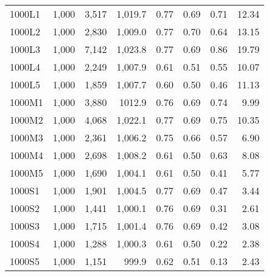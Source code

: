 \begin{table}
{\begin{tabular}{lrrrrrrr}
    \hline
 1000L1           & 1,000  & 3,517                        &1,019.7      & 0.77            & 0.69           & 0.71           & 12.34          \\
 1000L2           & 1,000 & 2,830                            &   1,009.0& 0.77            & 0.70           & 0.64           & 13.15          \\
 1000L3           & 1,000 & 7,142                         &1,023.8      & 0.77            & 0.69           & 0.86           & 19.79          \\
 1000L4           & 1,000 & 2,249                         &1,007.9      & 0.61            & 0.51           & 0.55           & 10.07          \\
 1000L5           & 1,000       & 1,859                        &1,007.7 & 0.60            & 0.50           & 0.46           & 11.13          \\
 1000M1           & 1,000 & 3,880 &1012.9                         & 0.76            & 0.69           & 0.74           & 9.99           \\
 1000M2           & 1,000       & 4,068  &1,022.1                       & 0.77            & 0.69           & 0.75           & 10.35          \\
 1000M3           & 1,000       & 2,361         &1,006.2                & 0.75            & 0.66           & 0.57           & 6.90           \\
 1000M4           & 1,000       & 2,698 &1,008.2                        & 0.61            & 0.50           & 0.63           & 8.08           \\
 1000M5           & 1,000       & 1,690 &1,004.1                        & 0.61            & 0.50           & 0.41           & 5.77           \\
 1000S1           & 1,000       & 1,901   &1,004.5                      & 0.77            & 0.69           & 0.47           & 3.44           \\
 1000S2           & 1,000       & 1,441  &1,000.1                       & 0.76            & 0.69           & 0.31           & 2.61           \\
 1000S3           & 1,000       & 1,715  &1,001.4                       & 0.76            & 0.69           & 0.42           & 3.08           \\
 1000S4           & 1,000       & 1,288    &1,000.3                     & 0.61            & 0.50           & 0.22           & 2.38           \\
 1000S5           & 1,000       & 1,151    &999.9                     & 0.62            & 0.51           & 0.13           & 2.43           \\

\end{tabular}}
\end{table}
